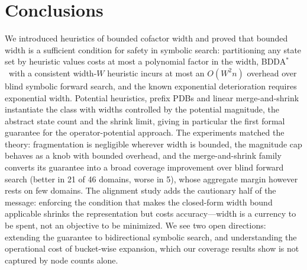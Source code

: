 \documentclass[letterpaper]{article}
\newcommand{\bddastar}{BDDA\ensuremath{^{*}}}
\theoremstyle{plain}
\theoremstyle{definition}
\theoremstyle{remark}
\begin{document}
\section{Conclusions}

We introduced heuristics of bounded cofactor width and proved that
bounded width is a sufficient condition for safety in symbolic search:
partitioning any state set by heuristic values costs at most a
polynomial factor in the width, \bddastar\ with a consistent width-$W$
heuristic incurs at most an $O(W^2 n)$ overhead over blind symbolic
forward search, and the known exponential deterioration requires
exponential width. Potential heuristics, prefix PDBs and linear
merge-and-shrink instantiate the class with widths controlled by the
potential magnitude, the abstract state count and the shrink limit,
giving in particular the first formal guarantee for the
operator-potential approach. The experiments matched the theory:
fragmentation is negligible wherever width is bounded, the magnitude cap
behaves as a knob with bounded overhead, and the merge-and-shrink family
converts its guarantee into a broad coverage improvement over blind
forward search (better in 21 of 46 domains, worse in 5), whose aggregate
margin however rests on few domains. The alignment study adds the cautionary half of the message:
enforcing the condition that makes the closed-form width bound
applicable shrinks the representation but costs accuracy---width is a
currency to be spent, not an objective to be minimized. We see two open
directions: extending the guarantee to bidirectional symbolic search,
and understanding the operational cost of bucket-wise expansion, which
our coverage results show is not captured by node counts alone.



\end{document}
